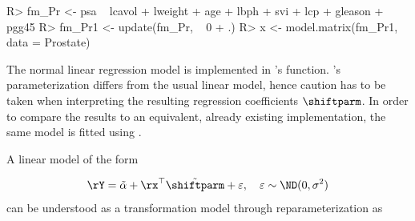 \begin{example}
R> fm_Pr <- psa ~ lcavol + lweight + age + lbph + svi + lcp + gleason + pgg45
R> fm_Pr1 <- update(fm_Pr, ~ 0 + .)
R> x <- model.matrix(fm_Pr1, data = Prostate)
\end{example}
The normal linear regression model is implemented in 's  function.
's parameterization differs from the usual linear model, hence caution has
to be taken when interpreting the resulting regression coefficients $\shiftparm$.
In order to compare the results to an equivalent, already existing implementation,
the same model is fitted using .
A linear model of the form

\begin{align*}
\rY = \tilde{\alpha} + \rx^\top \tilde{\shiftparm} + \varepsilon,
    \quad \varepsilon \sim \ND(0, \sigma^2)
\end{align*}
can be understood as a transformation model through reparameterization as

